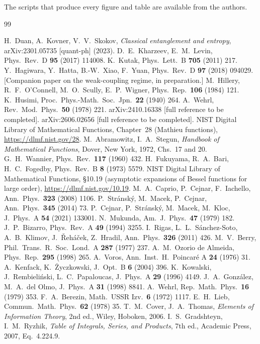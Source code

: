 \documentclass[preprint,12pt]{elsarticle}
\begin{document}
\noindent The scripts that produce every figure and table are available from
the authors.

\begin{thebibliography}{99}

 H.~Duan, A.~Kovner, V.~V.~Skokov,
\emph{Classical entanglement and entropy}, arXiv:2301.05735 [quant-ph] (2023).
 D.~E.~Kharzeev, E.~M.~Levin,
Phys.\ Rev.\ D \textbf{95} (2017) 114008.
 K.~Kutak, Phys.\ Lett.\ B \textbf{705} (2011) 217.
 Y.~Hagiwara, Y.~Hatta, B.-W.~Xiao, F.~Yuan,
Phys.\ Rev.\ D \textbf{97} (2018) 094029.
 [Companion paper on the weak-coupling regime, in
preparation.]
 M.~Hillery, R.~F.~O'Connell, M.~O.~Scully, E.~P.~Wigner,
Phys.\ Rep.\ \textbf{106} (1984) 121.
 K.~Husimi, Proc.\ Phys.-Math.\ Soc.\ Jpn.\ \textbf{22} (1940) 264.
 A.~Wehrl, Rev.\ Mod.\ Phys.\ \textbf{50} (1978) 221.
 arXiv:2410.16338 [full reference to be completed].
 arXiv:2606.02656 [full reference to be completed].
 NIST Digital Library of Mathematical Functions, Chapter~28
(Mathieu functions), \url{https://dlmf.nist.gov/28}.
 M.~Abramowitz, I.~A.~Stegun, \emph{Handbook of
Mathematical Functions}, Dover, New York, 1972, Chs.~17 and 20.
 G.~H.~Wannier, Phys.\ Rev.\ \textbf{117} (1960) 432.
 H.~Fukuyama, R.~A.~Bari, H.~C.~Fogedby,
Phys.\ Rev.\ B \textbf{8} (1973) 5579.
 NIST Digital Library of Mathematical Functions, \S10.19
(asymptotic expansions of Bessel functions for large order),
\url{https://dlmf.nist.gov/10.19}.
 M.~A.~Caprio, P.~Cejnar, F.~Iachello,
Ann.\ Phys.\ \textbf{323} (2008) 1106.
 P.~Str\'ansk\'y, M.~Macek, P.~Cejnar,
Ann.\ Phys.\ \textbf{345} (2014) 73.
 P.~Cejnar, P.~Str\'ansk\'y, M.~Macek, M.~Kloc,
J.~Phys.\ A \textbf{54} (2021) 133001.
 N.~Mukunda, Am.\ J.\ Phys.\ \textbf{47} (1979) 182.
 J.~P.~Bizarro, Phys.\ Rev.\ A \textbf{49} (1994) 3255.
 I.~Rigas, L.~L.~S\'anchez-Soto, A.~B.~Klimov,
J.~\v{R}eh\'a\v{c}ek, Z.~Hradil, Ann.\ Phys.\ \textbf{326} (2011) 426.
 M.~V.~Berry, Phil.\ Trans.\ R.\ Soc.\ Lond.\ A \textbf{287}
(1977) 237.
 A.~M.~Ozorio de Almeida, Phys.\ Rep.\ \textbf{295} (1998) 265.
 A.~Voros, Ann.\ Inst.\ H.\ Poincar\'e A \textbf{24} (1976) 31.
 A.~Kenfack, K.~\.Zyczkowski, J.~Opt.\ B \textbf{6} (2004) 396.
 K.~Kowalski, J.~Rembieli\'nski, L.~C.~Papaloucas,
J.~Phys.\ A \textbf{29} (1996) 4149.
 J.~A.~Gonz\'alez, M.~A.~del Olmo,
J.~Phys.\ A \textbf{31} (1998) 8841.
 A.~Wehrl, Rep.\ Math.\ Phys.\ \textbf{16} (1979) 353.
 F.~A.~Berezin, Math.\ USSR Izv.\ \textbf{6} (1972) 1117.
 E.~H.~Lieb, Commun.\ Math.\ Phys.\ \textbf{62} (1978) 35.
 T.~M.~Cover, J.~A.~Thomas, \emph{Elements of Information
Theory}, 2nd ed., Wiley, Hoboken, 2006.
 I.~S.~Gradshteyn, I.~M.~Ryzhik, \emph{Table of Integrals, Series,
and Products}, 7th ed., Academic Press, 2007, Eq.~4.224.9.

\end{thebibliography}
\end{document}
